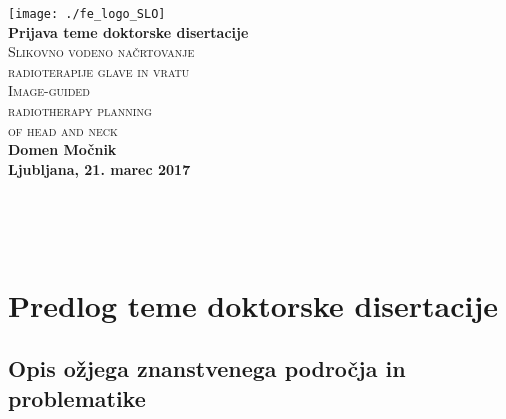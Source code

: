 \documentclass[a4paper,twoside,11pt]{article}
\begin{document}
	\thispagestyle{empty}
	\par{ \noindent
		\begin{center}
			\texttt{[image: ./fe\_logo\_SLO]} \\ \vspace{2.0cm}
			\textbf{\Large Prijava teme doktorske disertacije} \\ \vspace{2.0cm}
			\textsc{\Huge Slikovno vodeno načrtovanje} \\ \vspace{0.5cm}
			\textsc{\Huge radioterapije glave in vratu} \\ \vspace{1.0cm}
			\textsc{\Huge Image-guided} \\ \vspace{0.5cm}
			\textsc{\Huge radiotherapy planning} \\ \vspace{0.5cm}
			\textsc{\Huge of head and neck} \\ \vspace{2.2cm}
			\textbf{\Large Domen Močnik} \\ \vspace{2.0cm}
			\textbf{\large Ljubljana, 21. marec 2017 }
		\end{center}
	}
	\newpage
	\thispagestyle{empty}
	~\\
	\newpage
	
	
	\thispagestyle{empty}
	\renewcommand\contentsname{Vsebina}
	\tableofcontents
	\newpage
	\thispagestyle{empty}
	~\\
	\newpage
	
	
	\section{Predlog teme doktorske disertacije}
	\subsection{Opis ožjega znanstvenega področja in problematike}
\end{document}
